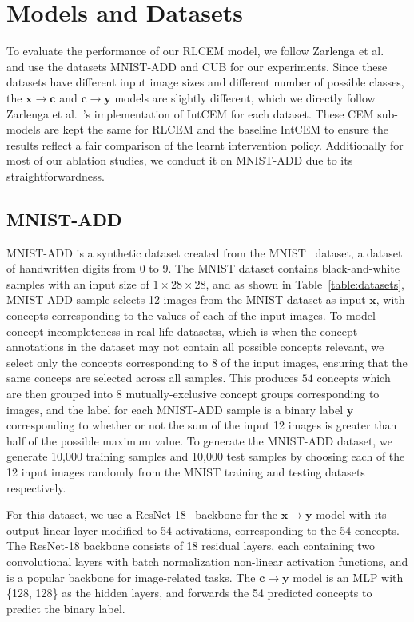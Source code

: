 \section{Models and Datasets}\label{method:datasets}
To evaluate the performance of our RLCEM model,
we follow Zarlenga et al.~\cite{intcem} and use the datasets MNIST-ADD and CUB for 
our experiments. Since these datasets have different input image sizes
and different number of possible classes,
the $\mathbf{x} \to \mathbf{c}$ and $\mathbf{c} \to \mathbf{y}$ models 
are slightly different, which we directly follow Zarlenga et al.~\cite{intcem}'s 
implementation of IntCEM for each dataset. These CEM sub-models are kept the same
for RLCEM and the baseline IntCEM to ensure the results reflect a fair comparison 
of the learnt intervention policy.
Additionally for most of our ablation studies,
we conduct it on MNIST-ADD due to its straightforwardness.

\subsection{MNIST-ADD}
MNIST-ADD is a synthetic dataset created from 
the MNIST~\cite{mnist} dataset, a dataset of handwritten digits from 0 to 9.
The MNIST dataset contains black-and-white samples with an input size 
of $1 \times 28 \times 28$, and as shown in Table~\ref{table:datasets}, 
MNIST-ADD sample 
selects 12 images from the MNIST dataset as input $\mathbf{x}$,
with concepts corresponding to the values of each of the input images.
To model concept-incompleteness in real life datasetss,
which is when the 
concept annotations in the dataset may not contain all
possible concepts relevant, we select only the concepts corresponding to 8
of the input images, ensuring that the same conceps are selected across
all samples. This produces $54$ concepts which are then grouped into 8 
mutually-exclusive concept groups corresponding to images, 
and the label for each MNIST-ADD sample
is a binary label $\mathbf{y}$ corresponding to whether or not the sum of the input
12 images is greater than half of the possible maximum value.
 To generate the MNIST-ADD dataset,
we generate 10,000 training samples and 10,000 test samples by choosing
each of the 12 input images randomly from the MNIST training and testing
datasets respectively.

For this dataset, we use a ResNet-18~\cite{resnet} backbone for the $\mathbf{x} \to \mathbf{y}$
model with its output linear layer modified to 54 activations, corresponding
to the 54 concepts. The ResNet-18 backbone consists of 18 residual layers,
each containing two convolutional layers with batch normalization non-linear
activation functions, and is a popular backbone for image-related tasks.
The $\mathbf{c} \to \mathbf{y}$ model is an MLP with \{128, 128\} as the hidden
layers, and forwards the 54 predicted concepts to predict the binary label.

